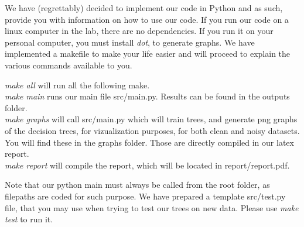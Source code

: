 We have (regrettably) decided to implement our code in Python and as such, provide you with information on how to use our code.
If you run our code on a linux computer in the lab, there are no dependencies. If you run it on your personal computer, you must install \emph{dot}, to generate graphs.
We have implemented a makefile to make your life easier and will proceed to explain the various commands available to you.

\emph{make all} will run all the following make.\\
\emph{make main} runs our main file  src/main.py. Results can be found in the  outputs folder.\\
\emph{make graphs} will call  src/main.py which will train trees, and generate png graphs of the decision trees, for vizualization purposes,
for both clean and noisy datasets. You will find these in the  graphs folder.
Those are directly compiled in our latex report.\\
\emph{make report} will compile the report, which will be located in report/report.pdf.

Note that our python main must always be called from the root folder, as filepaths are coded for such purpose.
We have prepared a template  src/test.py file, that you may use when
trying to test our trees on new data.
Please use  \emph{make test} to run it.




